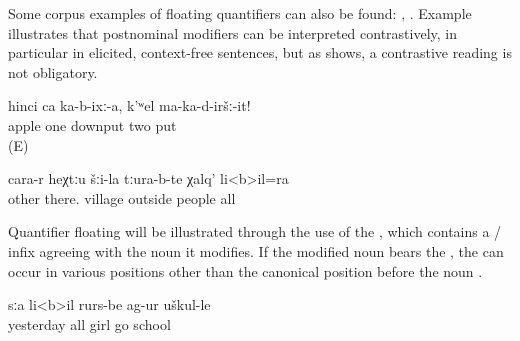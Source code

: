 Some corpus examples of floating quantifiers can also be found: , . Example  illustrates that postnominal modifiers can be interpreted contrastively, in particular in elicited, context-free sentences, but as  shows, a contrastive reading is not obligatory. 

\begin{exe}
		\ex	\label{ex:‎‎‎Put one apple (there), do not put two (apples)}
	\gll	hinci	ca	ka-b-ixː-a,	k'ʷel	ma-ka-d-iršː-it!\\
		apple	one	downput	two	put\\
	\glt	{} (E)
	
	\ex	\label{ex:and all the people from the other villages down there}
	\gll	cara-r	heχtːu	šːi-la	tːura-b-te	χalq'	li<b>il=ra\\
		other	there.	village	outside 	people	all\\
	\glt	{}
	
\end{exe}

Quantifier floating will be illustrated through the use of the  , which contains a / infix agreeing with the noun it modifies. If the modified noun bears the , the  can occur in various positions other than the canonical position before the noun . 


%
\begin{exe}
	\ex	\label{ex:Yesterday all girls went to school}
	\begin{xlist}
		\ex	\label{ex:Yesterday all girls went to school@A}
		\gll	sːa	li<b>il	rurs-be	ag-ur	uškul-le\\
			yesterday	all	girl	go	school\\
		\glt	{}

		\ex	{}	\label{ex:Yesterday all girls went to school@B}

		\ex	{}	\label{ex:Yesterday all girls went to school@C}

		\ex	{}	\label{ex:Yesterday all girls went to school@D}

	\end{xlist}
\end{exe}

